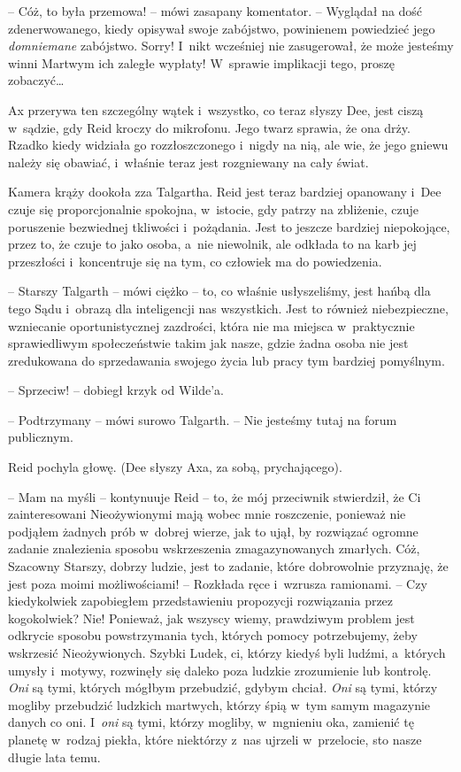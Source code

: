 \documentclass[oneside,polish,11pt,sfheadings]{mwbk}
\begin{document}
-- Cóż, to była przemowa! -- mówi zasapany komentator. -- Wyglądał na dość
zdenerwowanego, kiedy opisywał swoje zabójstwo, powinienem powiedzieć
jego \emph{domniemane} zabójstwo. Sorry! I~nikt wcześniej nie
zasugerował, że może jesteśmy winni Martwym ich zaległe wypłaty! W~sprawie implikacji tego, proszę zobaczyć\ldots

Ax przerywa ten szczególny wątek i~wszystko, co teraz słyszy Dee, jest
ciszą w~sądzie, gdy Reid kroczy do mikrofonu. Jego twarz sprawia, że ona
drży. Rzadko kiedy widziała go rozzłoszczonego i~nigdy na nią, ale wie,
że jego gniewu należy się obawiać, i~właśnie teraz jest rozgniewany na
cały świat.

Kamera krąży dookoła zza Talgartha. Reid jest teraz bardziej opanowany i~Dee czuje się proporcjonalnie spokojna, w~istocie, gdy patrzy na
zbliżenie, czuje poruszenie bezwiednej tkliwości i~pożądania. Jest to
jeszcze bardziej niepokojące, przez to, że czuje to jako osoba, a~nie
niewolnik, ale odkłada to na karb jej przeszłości i~koncentruje się na
tym, co człowiek ma do powiedzenia.

-- Starszy Talgarth -- mówi ciężko -- to, co właśnie usłyszeliśmy, jest
hańbą dla tego Sądu i~obrazą dla inteligencji nas wszystkich. Jest to
również niebezpieczne, wzniecanie oportunistycznej zazdrości, która nie
ma miejsca w~praktycznie sprawiedliwym społeczeństwie takim jak nasze,
gdzie żadna osoba nie jest zredukowana do sprzedawania swojego życia lub
pracy tym bardziej pomyślnym.

-- Sprzeciw! -- dobiegł krzyk od Wilde'a.

-- Podtrzymany -- mówi surowo Talgarth. -- Nie jesteśmy tutaj na forum
publicznym.

Reid pochyla głowę. (Dee słyszy Axa, za sobą, prychającego).

-- Mam na myśli -- kontynuuje Reid -- to, że mój przeciwnik stwierdził, że
Ci zainteresowani Nieożywionymi mają wobec mnie roszczenie, ponieważ nie
podjąłem żadnych prób w~dobrej wierze, jak to ujął, by rozwiązać ogromne
zadanie znalezienia sposobu wskrzeszenia zmagazynowanych zmarłych. Cóż,
Szacowny Starszy, dobrzy ludzie, jest to zadanie, które dobrowolnie
przyznaję, że jest poza moimi możliwościami! -- Rozkłada ręce i~wzrusza
ramionami. -- Czy kiedykolwiek zapobiegłem przedstawieniu propozycji
rozwiązania przez kogokolwiek? Nie! Ponieważ, jak wszyscy wiemy,
prawdziwym problem jest odkrycie sposobu powstrzymania tych, których
pomocy potrzebujemy, żeby wskrzesić Nieożywionych. Szybki Ludek, ci,
którzy kiedyś byli ludźmi, a~których umysły i~motywy, rozwinęły się
daleko poza ludzkie zrozumienie lub kontrolę. \emph{Oni} są tymi,
których mógłbym przebudzić, gdybym chciał. \emph{Oni} są tymi, którzy
mogliby przebudzić ludzkich martwych, którzy śpią w~tym samym magazynie
danych co oni. I~\emph{oni} są tymi, którzy mogliby, w~mgnieniu oka,
zamienić tę planetę w~rodzaj piekła, które niektórzy z~nas ujrzeli w~przelocie, sto nasze długie lata temu.
\end{document}
